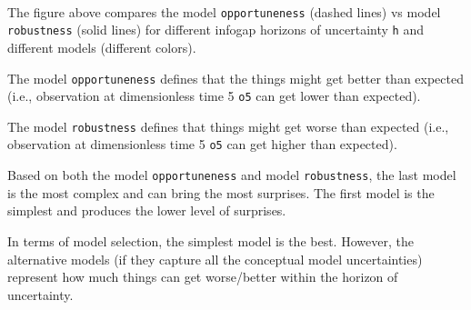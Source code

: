 \documentclass[11pt]{article}
\begin{document}
    \begin{center}
    \end{center}
    { \hspace*{\fill} \\}
    
    \begin{Verbatim}[commandchars=\\\{\}]

    \end{Verbatim}

    The figure above compares the model \texttt{opportuneness} (dashed
lines) vs model \texttt{robustness} (solid lines) for different infogap
horizons of uncertainty \texttt{h} and different models (different
colors).

The model \texttt{opportuneness} defines that the things might get
better than expected (i.e., observation at dimensionless time 5
\texttt{o5} can get lower than expected).

The model \texttt{robustness} defines that things might get worse than
expected (i.e., observation at dimensionless time 5 \texttt{o5} can get
higher than expected).

Based on both the model \texttt{opportuneness} and model
\texttt{robustness}, the last model is the most complex and can bring
the most surprises. The first model is the simplest and produces the
lower level of surprises.

In terms of model selection, the simplest model is the best. However,
the alternative models (if they capture all the conceptual model
uncertainties) represent how much things can get worse/better within the
horizon of uncertainty.


    
    
    
\end{document}
